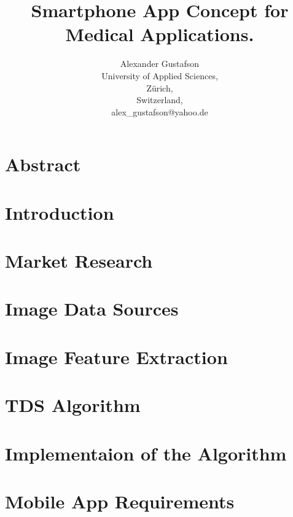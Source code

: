 \documentclass{report}
\title{Smartphone App Concept for Medical Applications.}
\author{Alexander Gustafson\\
  University of Applied Sciences,\\
  Zürich,\\
  Switzerland,\\
  alex\_gustafson@yahoo.de}
\date{\parbox{\linewidth}{\centering%
  \today\endgraf\bigskip
  Dozent: Reto Knaack (knaa@zhaw.ch)\endgraf\bigskip
  School of Engineering, Abteilung Zürich \endgraf
  Studiengang Informatik\endgraf
  }}
\begin{document}
\maketitle

\chapter*{Abstract}


\tableofcontents

\chapter{Introduction}


\chapter{Market Research}


\chapter{Image Data Sources}


\chapter{Image Feature Extraction}


\chapter{TDS Algorithm}


% 

\chapter{Implementaion of the Algorithm}


\chapter{Mobile App Requirements}

\end{document}
